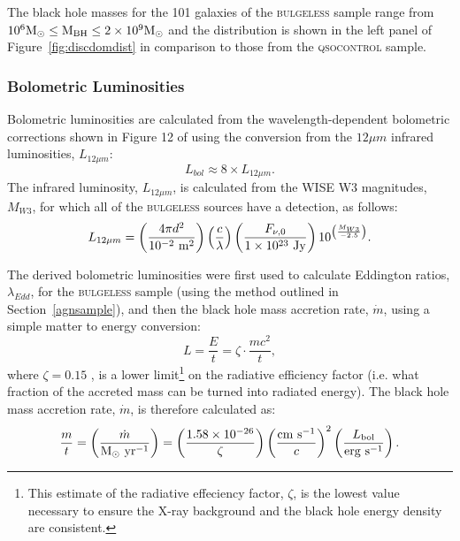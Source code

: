 {The black hole masses for the 101 galaxies of the \textsc{bulgeless} sample range from {\notebsm $10^6 \rm{M}_{\odot} \leq M_{\rm BH} \leq 2 \times 10^9 \rm{M}_{\odot}$} and the distribution is shown in the left panel of Figure~\ref{fig:discdomdist} in comparison to those from the \textsc{qsocontrol} sample. 

\subsubsection{Bolometric Luminosities}\label{sec:eddratios}

Bolometric luminosities are calculated from the wavelength-dependent bolometric corrections shown in Figure 12 of \citet{richards06} using the conversion from the $12\mu m$ infrared luminosities, $ L_{12\mu m}$:
\begin{equation}
L_{bol} \approx 8 \times L_{12\mu m}.
\end{equation}
The infrared luminosity,  $L_{12\mu m}$, is calculated from the WISE W3 magnitudes, $M_{W3}$, for which all of the \textsc{bulgeless} sources have a detection, as follows:
\begin{equation}
L_{12\mu m} = \left(\frac{4\pi d^2}{10^{-2}~\rm{m}^2}\right)\left( \frac{c}{\lambda}\right) \left(\frac{F_{\nu, 0}}{1\times10^{23}~ \rm{Jy}} \right)10^{\left(\frac{M_{W3}}{-2.5}\right)}.
\end{equation}

The derived bolometric luminosities were first used to calculate Eddington ratios, $\lambda_{Edd}$, for the \textsc{bulgeless} sample (using the method outlined in Section~\ref{agnsample}), and then the black hole mass accretion rate, $\dot{m}$, using a simple matter to energy conversion:
\begin{equation}\label{eq:ltomdot}
L = \frac{E}{t} = \zeta\cdot \frac{mc^2}{t},
\end{equation}
where $\zeta =0.15$ \citep{elvis02}, is a lower limit\footnote{This estimate of the radiative effeciency factor, $\zeta$, is the lowest value necessary to ensure the X-ray background and the black hole energy density are consistent.} on the radiative efficiency factor (i.e. what fraction of the accreted mass can be turned into radiated energy). The black hole mass accretion rate, $\dot{m}$, is therefore calculated as:
\begin{equation}\label{eq:mdot}
\frac{m}{t} = \left(\frac{\dot{m}}{\rm{M}_{\odot}~\rm{yr}^{-1}}\right) = \left( \frac{1.58\times 10^{-26}}{\zeta} \right) \left( \frac{\rm{cm}~\rm{s}^{-1}}{c} \right)^2 \left( \frac{L_{\rm{bol}}}{\rm{erg}~\rm{s}^{-1}} \right).
\end{equation}


}
